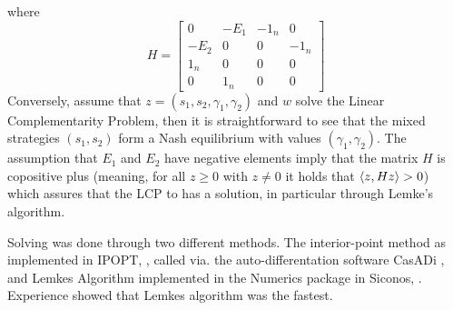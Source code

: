 where
\[
  H =
  \left[
    \begin{array}{cccc}
      0 & -E_1 & -1_n & 0 \\ -E_2 & 0 & 0 & -1_n \\
      1_n & 0 & 0 & 0 \\
      0 & 1_n & 0 & 0
    \end{array}
  \right]
\]
Conversely, assume that $z=(s_1,s_2,\gamma_1,\gamma_2)$ and $w$ solve the Linear Complementarity Problem, then it is straightforward to see that the mixed strategies $(s_1,s_2)$ form a Nash equilibrium with values $(\gamma_1,\gamma_2)$. The assumption that $E_1$ and $E_2$ have negative elements imply that the matrix $H$ is copositive plus (meaning, for all $z\geq0$ with $z\neq0$ it holds that $\left \langle z,Hz \right \rangle>0$) which assures that the LCP to has a solution, in particular through Lemke's algorithm.

Solving  was done through two different methods. The interior-point method as implemented in IPOPT, \citep{wachter2006implementation}, called via. the auto-differentation software CasADi \citep{Andersson2019}, and Lemkes Algorithm implemented in the Numerics package in Siconos, \citep{acary2019introduction}. Experience showed that Lemkes algorithm was the fastest.


